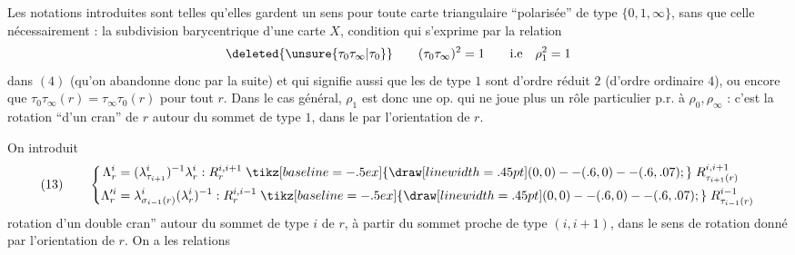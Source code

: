 
Les notations introduites sont telles qu'elles gardent un sens pour toute carte triangulaire ``polarisée'' de type $\{0,1,\infty\}$, sans que celle  nécessairement : la subdivision barycentrique d'une carte $X$, condition qui s'exprime par la   relation
\[
\deleted{\unsure{\tau_0\tau_\infty|\tau_0}}\qquad (\tau_0\tau_\infty)^2=1\qquad\text{i.e}\quad\rho_1^2=1
\]
dans $(4)$ (qu'on abandonne donc par la suite) et qui signifie aussi que les   de type $1$ sont d'ordre réduit $2$ (d'ordre ordinaire $4$), ou encore que $\tau_0\tau_\infty(r)=\tau_\infty\tau_0(r)$ pour tout $r$. Dans le cas général, $\rho_1$ est donc une op. qui ne joue plus un rôle particulier p.r. à $\rho_0,\rho_\infty$ : c'est la rotation ``d'un cran'' de $r$ autour du sommet de type $1$, dans le   par l'orientation de $r$.

On introduit
\[
(13)\qquad\left\{
\begin{aligned}
\Lambda_r^i&=(\lambda_{\tau_{i+1}}^i)^{-1}\lambda_r^i:R_r^{i,i+1}\mathrel{\tikz[baseline=-.5ex]{\draw[line width=.45pt] (0,0)--(.6,0)--(.6,.07);}} R_{\tau_{i+1}(r)}^{i,i+1}\\
\Lambda_r^{\prime i}&=\lambda_{\sigma_{i-1}(r)}^i(\lambda_r^i)^{-1}:R_r^{i,i-1}\mathrel{\tikz[baseline=-.5ex]{\draw[line width=.45pt] (0,0)--(.6,0)--(.6,.07);}} R_{\tau_{i-1}(r)}^{i-1}
\end{aligned}\right.
\]
rotation d'un double cran'' autour du sommet de type $i$ de $r$, à partir du sommet proche de type $(i,i+1)$,  dans le sens de rotation donné par l'orientation de $r$. On a les relations

